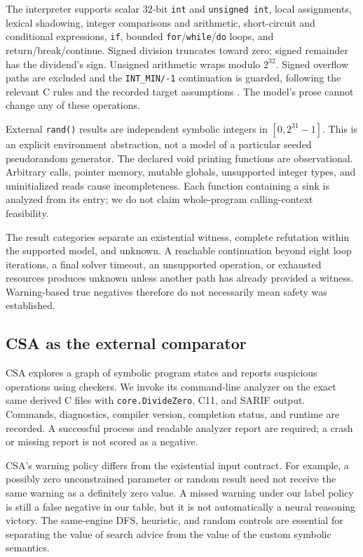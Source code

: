 \documentclass[sigconf]{acmart}
\begin{document}
The interpreter supports scalar 32-bit \texttt{int} and \texttt{unsigned int},
local assignments, lexical shadowing, integer comparisons and arithmetic,
short-circuit and conditional expressions, \texttt{if}, bounded
\texttt{for}/\texttt{while}/\texttt{do} loops, and return/break/continue.
Signed division truncates toward zero; signed remainder has the dividend's
sign. Unsigned arithmetic wraps modulo $2^{32}$. Signed overflow paths are
excluded and the \texttt{INT\_MIN/-1} continuation is guarded, following
the relevant C rules and the recorded target assumptions \cite{c11}.
The model's prose cannot change any of these operations.

External \texttt{rand()} results are independent symbolic integers in
$[0,2^{31}-1]$. This is an explicit environment abstraction, not a model of
a particular seeded pseudorandom generator. The declared void printing
functions are observational. Arbitrary calls, pointer memory, mutable
globals, unsupported integer types, and uninitialized reads cause
incompleteness. Each function containing a sink is analyzed from its entry;
we do not claim whole-program calling-context feasibility.

The result categories separate an existential witness, complete refutation
within the supported model, and unknown. A reachable continuation beyond
eight loop iterations, a final solver timeout, an unsupported operation,
or exhausted resources produces unknown unless another path has already
provided a witness. Warning-based true negatives therefore do not necessarily
mean safety was established.

\subsection{CSA as the external comparator}
CSA explores a graph of symbolic program states and reports suspicious
operations using checkers. We invoke its command-line analyzer on the exact
same derived C files with \texttt{core.DivideZero}, C11, and SARIF output.
Commands, diagnostics, compiler version, completion status, and runtime are
recorded. A successful process and readable analyzer report are required;
a crash or missing report is not scored as a negative.

CSA's warning policy differs from the existential input contract. For
example, a possibly zero unconstrained parameter or random result need not
receive the same warning as a definitely zero value. A missed warning under
our label policy is still a false negative in our table, but it is not
automatically a neural reasoning victory. The same-engine DFS, heuristic,
and random controls are essential for separating the value of search advice
from the value of the custom symbolic semantics.
\end{document}
